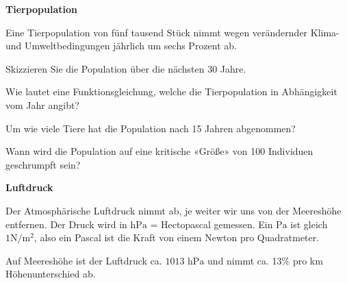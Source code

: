 

\bbwActAufgabenNr{} \textbf{Tierpopulation}

Eine Tierpopulation von fünf tausend Stück nimmt wegen verändernder Klima-
und Umweltbedingungen jährlich um sechs Prozent ab.


\begin{bbwAufgabenBlock}

\item Skizzieren Sie die Population über die nächsten 30 Jahre.
\item Wie lautet eine Funktionsgleichung, welche die Tierpopulation in
  Abhängigkeit vom Jahr angibt?
\item Um wie viele Tiere hat die Population nach 15 Jahren abgenommen?


  

\item Wann wird die Population auf eine kritische «Größe» von 100
  Individuen geschrumpft sein?
\end{bbwAufgabenBlock}
\platzFuerBerechnungenBisEndeSeite{}


\bbwActAufgabenNr{} \textbf{Luftdruck}

Der Atmosphärische Luftdruck nimmt ab, je weiter wir uns von der
Meereshöhe entfernen. Der Druck wird in $\textrm{hPa}$ = Hectopascal
gemessen. Ein $\textrm{Pa}$ ist gleich $1 \textrm{N}/\textrm{m}^2$, also ein
Pascal ist die Kraft von einem Newton pro Quadratmeter.

Auf Meereshöhe ist der Luftdruck ca. $ 1013 \textrm{ hPa}$ und nimmt
ca. 13\% pro km Höhenunterschied ab.

